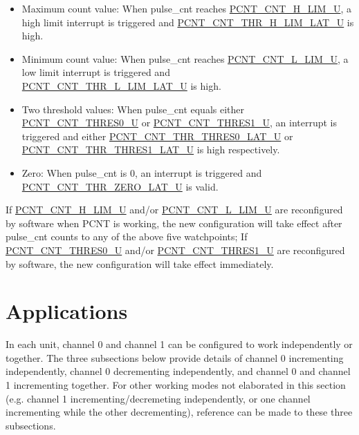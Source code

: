 \documentclass[main\_\_EN.tex]{subfiles}
\begin{document}
\begin{itemize}
    \item Maximum count value: When pulse\_cnt reaches \hyperref[fielddesc:PCNTCNTHLIMUN]{PCNT\_CNT\_H\_LIM\_U}, a high limit interrupt is triggered and \hyperref[fielddesc:PCNTCNTTHRHLIMLATUN]{PCNT\_CNT\_THR\_H\_LIM\_LAT\_U} is high.
    \item Minimum count value: When pulse\_cnt reaches \hyperref[fielddesc:PCNTCNTLLIMUN]{PCNT\_CNT\_L\_LIM\_U}, a low limit interrupt is triggered and \\\hyperref[fielddesc:PCNTCNTTHRLLIMLATUN]{PCNT\_CNT\_THR\_L\_LIM\_LAT\_U} is high.
    \item Two threshold values: When pulse\_cnt equals either \hyperref[fielddesc:PCNTCNTTHRES0UN]{PCNT\_CNT\_THRES0\_U} or \hyperref[fielddesc:PCNTCNTTHRES1UN]{PCNT\_CNT\_THRES1\_U}, an interrupt is triggered and either \hyperref[fielddesc:PCNTCNTTHRTHRES0LATUN]{PCNT\_CNT\_THR\_THRES0\_LAT\_U} or \hyperref[fielddesc:PCNTCNTTHRTHRES1LATUN]{PCNT\_CNT\_THR\_THRES1\_LAT\_U} is high respectively.
    \item Zero: When pulse\_cnt is 0, an interrupt is triggered and \hyperref[fielddesc:PCNTCNTTHRZEROLATUN]{PCNT\_CNT\_THR\_ZERO\_LAT\_U} is valid.
\end{itemize}

If \hyperref[fielddesc:PCNTCNTHLIMUN]{PCNT\_CNT\_H\_LIM\_U} and/or \hyperref[fielddesc:PCNTCNTLLIMUN]{PCNT\_CNT\_L\_LIM\_U} are reconfigured by software when PCNT is working, the new configuration will take effect after pulse\_cnt counts to any of the above five watchpoints; If \hyperref[fielddesc:PCNTCNTTHRES0UN]{PCNT\_CNT\_THRES0\_U} and/or \hyperref[fielddesc:PCNTCNTTHRES1UN]{PCNT\_CNT\_THRES1\_U} are reconfigured by software, the new configuration will take effect immediately.

\section{Applications}

In each unit, channel 0 and channel 1 can be configured to work independently or together. The three subsections below provide details of channel 0 incrementing independently, channel 0 decrementing independently, and channel 0 and channel 1 incrementing together. For other working modes not elaborated in this section (e.g. channel 1 incrementing/decremeting independently, or one channel incrementing while the other decrementing), reference can be made to these three subsections.
\end{document}
